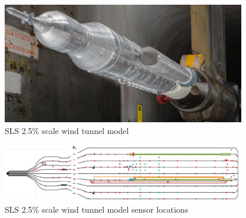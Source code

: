 \documentclass[]{aiaa-tc}%
\begin{document}
\begin{figure}[htb]
\begin{center}
\includegraphics[width=0.95\textwidth]{Images/SLS_WTT_MPCV.png}
\caption{SLS 2.5\% scale wind tunnel model \cite{SLSAscentWTT}}
\label{SLSWTT}
\end{center}
\end{figure}

\begin{figure}[htb]
\begin{center}
\includegraphics[width=0.95\textwidth]{Images/SLS_WTT_MPCV_SensorLocation.png}
\caption{SLS 2.5\% scale wind tunnel model sensor locations \cite{SLSAscentWTT}}
\label{SLSWTTsensor}
\end{center}
\end{figure}
\end{document}
